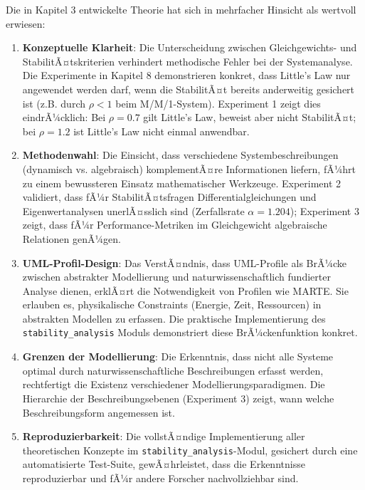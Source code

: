 ﻿\documentclass[a4paper,12pt]{scrreprt}
\theoremstyle{definition}
\begin{document}
Die in Kapitel 3 entwickelte Theorie hat sich in mehrfacher Hinsicht als wertvoll erwiesen:

\begin{enumerate}
	\item[-] \textbf{Konzeptuelle Klarheit}: Die Unterscheidung zwischen Gleichgewichts- und StabilitÃ¤tskriterien verhindert methodische Fehler bei der Systemanalyse. Die Experimente in Kapitel 8 demonstrieren konkret, dass Little's Law nur angewendet werden darf, wenn die StabilitÃ¤t bereits anderweitig gesichert ist (z.B. durch $\rho < 1$ beim M/M/1-System). Experiment 1 zeigt dies eindrÃ¼cklich: Bei $\rho = 0.7$ gilt Little's Law, beweist aber nicht StabilitÃ¤t; bei $\rho = 1.2$ ist Little's Law nicht einmal anwendbar.
	
	\item[-] \textbf{Methodenwahl}: Die Einsicht, dass verschiedene Systembeschreibungen (dynamisch vs. algebraisch) komplementÃ¤re Informationen liefern, fÃ¼hrt zu einem bewussteren Einsatz mathematischer Werkzeuge. Experiment 2 validiert, dass fÃ¼r StabilitÃ¤tsfragen Differentialgleichungen und Eigenwertanalysen unerlÃ¤sslich sind (Zerfallsrate $\alpha = 1.204$); Experiment 3 zeigt, dass fÃ¼r Performance-Metriken im Gleichgewicht algebraische Relationen genÃ¼gen.
	
	\item[-] \textbf{UML-Profil-Design}: Das VerstÃ¤ndnis, dass UML-Profile als BrÃ¼cke zwischen abstrakter Modellierung und naturwissenschaftlich fundierter Analyse dienen, erklÃ¤rt die Notwendigkeit von Profilen wie MARTE. Sie erlauben es, physikalische Constraints (Energie, Zeit, Ressourcen) in abstrakten Modellen zu erfassen. Die praktische Implementierung des \texttt{stability\_analysis} Moduls demonstriert diese BrÃ¼ckenfunktion konkret.
	
	\item[-] \textbf{Grenzen der Modellierung}: Die Erkenntnis, dass nicht alle Systeme optimal durch naturwissenschaftliche Beschreibungen erfasst werden, rechtfertigt die Existenz verschiedener Modellierungsparadigmen. Die Hierarchie der Beschreibungsebenen (Experiment 3) zeigt, wann welche Beschreibungsform angemessen ist.
	
    \item[-] \textbf{Reproduzierbarkeit}: Die vollstÃ¤ndige Implementierung
	aller theoretischen Konzepte im \texttt{stability\_analysis}-Modul,
	gesichert durch eine automatisierte Test-Suite, gewÃ¤hrleistet, dass
	die Erkenntnisse reproduzierbar und fÃ¼r andere Forscher nachvollziehbar
	sind.
\end{enumerate}
\end{document}
